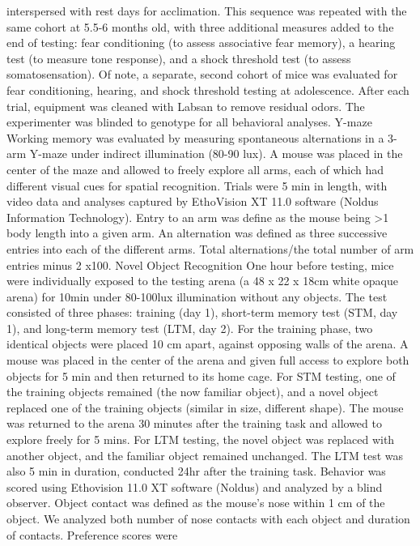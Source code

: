 interspersed with rest days for acclimation. This sequence was repeated with the
same cohort at 5.5-6 months old, with three additional measures added to the end
of testing: fear conditioning (to assess associative fear memory), a hearing
test (to measure tone response), and a shock threshold test (to assess
somatosensation). Of note, a separate, second cohort of mice was evaluated for
fear conditioning, hearing, and shock threshold testing at adolescence. After
each trial, equipment was cleaned with Labsan to remove residual odors. The
experimenter was blinded to genotype for all behavioral analyses.
Y-maze
Working memory was evaluated by measuring spontaneous alternations in a 3-arm
Y-maze under indirect illumination (80-90 lux). A mouse was placed in the center
of the maze and allowed to freely explore all arms, each of which had different
visual cues for spatial recognition. Trials were 5 min in length, with video
data and analyses captured by EthoVision XT 11.0 software (Noldus Information
Technology). Entry to an arm was define as the mouse being >1 body length into a
given arm. An alternation was defined as three successive entries into each of
the different arms. Total %
alternations/the total number of arm entries minus 2 x100. 
Novel Object Recognition
One hour before testing, mice were individually exposed to the testing arena (a
48 x 22 x 18cm white opaque arena) for 10min under 80-100lux illumination
without any objects. The test consisted of three phases: training (day 1),
short-term memory test (STM, day 1), and long-term memory test (LTM, day 2). For
the training phase, two identical objects were placed 10 cm apart, against
opposing walls of the arena. A mouse was placed in the center of the arena and
given full access to explore both objects for 5 min and then returned to its
home cage. For STM testing, one of the training objects remained (the now
familiar object), and a novel object replaced one of the training objects
(similar in size, different shape). The mouse was returned to the arena 30
minutes after the training task and allowed to explore freely for 5 mins. For
LTM testing, the novel object was replaced with another object, and the familiar
object remained unchanged. The LTM test was also 5 min in duration, conducted
24hr after the training task. Behavior was scored using Ethovision 11.0 XT
software (Noldus) and analyzed by a blind observer. Object contact was defined
as the mouse’s nose within 1 cm of the object. We analyzed both number of nose
contacts with each object and duration of contacts. Preference scores were
